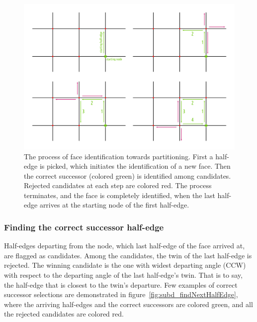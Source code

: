 \begin{figure} %
    \centering
    \includegraphics[width=1.\textwidth]{figures/subd_pathFollower.png}
    \caption{The process of face identification towards partitioning.
      First a half-edge is picked, which initiates the identification of a new face.
      Then the correct successor (colored green) is identified among candidates.
      Rejected candidates at each step are colored red.
      The process terminates, and the face is completely identified, when the last half-edge arrives at the starting node of the first half-edge.}
    \label{fig:subd_pathFollower}
\end{figure}

\subsubsection{Finding the correct successor half-edge}

Half-edges departing from the node, which last half-edge of the face arrived at, are flagged as candidates.
Among the candidates, the twin of the last half-edge is rejected.
The winning candidate is the one with widest departing angle (CCW) with respect to the departing angle of the last half-edge's twin.
That is to say, the half-edge that is closest to the twin's departure.
Few examples of correct successor selections are demonstrated in figure~\ref{fig:subd_findNextHalfEdge}, where the arriving half-edges and the correct successors are colored green, and all the rejected candidates are colored red.

